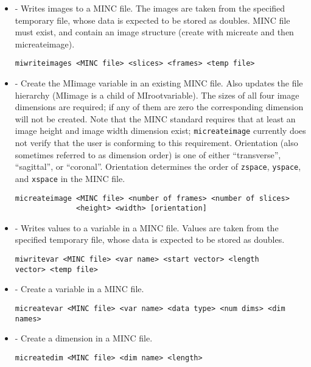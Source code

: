 \begin {itemize}

\item {} - Writes images to a MINC file.  The images
are taken from the specified temporary file, whose data is expected to
be stored as doubles.  MINC file must exist, and contain an image
structure (create with micreate and then micreateimage).
\begin{verbatim}
miwriteimages <MINC file> <slices> <frames> <temp file>
\end{verbatim}

\item {} - Create the MIimage variable in an existing 
MINC file.  Also updates the file hierarchy (MIimage is a child of
MIrootvariable).  The sizes of all four image dimensions are required;
if any of them are zero the corresponding dimension will not be created.
Note that the MINC standard requires that at least an image height and
image width dimension exist; \verb|micreateimage| currently does not
verify that the user is conforming to this requirement.  Orientation
(also sometimes referred to as dimension order) is one of either
``transverse'', ``sagittal'', or ``coronal''.  Orientation determines
the order of \verb|zspace|, \verb|yspace|, and \verb|xspace| in the
MINC file.
\begin{verbatim}
micreateimage <MINC file> <number of frames> <number of slices> 
              <height> <width> [orientation]
\end{verbatim}

\item {} - Writes values to a variable in a MINC file.  
Values are taken from the specified temporary file, whose data is
expected to be stored as doubles.
\begin{verbatim}
miwritevar <MINC file> <var name> <start vector> <length
vector> <temp file>
\end{verbatim}

\item {} - Create a variable in a MINC file.
\begin{verbatim}
micreatevar <MINC file> <var name> <data type> <num dims> <dim names>
\end{verbatim}

\item {} - Create a dimension in a MINC file.
\begin{verbatim}
micreatedim <MINC file> <dim name> <length>
\end{verbatim}


\end{itemize}
